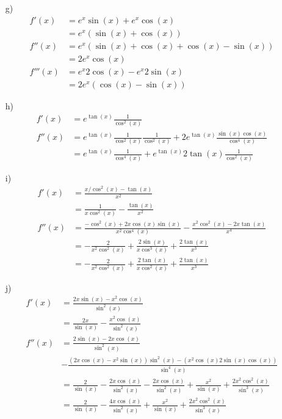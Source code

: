 {\begin{itemize}
\begin{align*}
f'''(x) &= 6 \cos^3(x) -6 \sin(x) 2 \cos(x)\sin(x)-9 \sin^2(x)\cos(x) \\
        &= 6 \cos^3(x) -21 \sin^2(x) \cos(x)             
\end{align*}
\item[g)]
\begin{align*}
f'(x) &= e^x \sin(x) + e^x \cos(x) \\
      &= e^x (\sin(x)+\cos(x)) \\
f''(x) &= e^x ( \sin(x) +\cos(x) +\cos(x) -\sin(x)) \\
       &= 2 e^x \cos(x) \\
f'''(x) &= e^x 2 \cos(x) - e^x 2 \sin(x) \\
        &= 2 e^x (\cos(x)-\sin(x))             
\end{align*}
\item[h)]
\begin{align*}
f'(x) &=   e^{\tan(x)} \frac{1}{\cos^2(x)}\\
f''(x) &=    e^{\tan(x)} \frac{1}{\cos^2(x)} \frac{1}{\cos^2(x)} + 2 e^{\tan(x)}  \frac{\sin(x) \cos(x)}{\cos^4(x)} \\
       &= e^{\tan(x)} \frac{1}{\cos^4(x)} + e^{\tan(x)} 2 \tan(x)  \frac{1}{\cos^2(x)}
\end{align*}
\item[i)]
\begin{align*}
f'(x) &= \frac{x/\cos^2(x) -\tan(x) }{x^2} \\
      &= \frac{1}{x \cos^2(x)} -\frac{\tan(x)}{x^2} \\
f''(x) &= \frac{-\cos^2(x)+2x\cos(x)\sin(x)}{x^2\cos^4(x)}- \frac{x^2\cos^2(x)-2x\tan(x)}{x^4} \\
       &= - \frac{2}{x^2 \cos^2(x)} +\frac{2 \sin(x)}{x \cos^3(x)} + \frac{2 \tan(x)}{x^3} \\
       &=   - \frac{2}{x^2 \cos^2(x)} +\frac{2 \tan(x)}{x \cos^2(x)} + \frac{2 \tan(x)}{x^3}    
\end{align*}
\item[j)]
\begin{align*}
f'(x) &=   \frac{2x \sin(x)-x^2\cos(x)}{\sin^2(x)}\\
      &= \frac{2x}{\sin(x)} - \frac{x^2 \cos(x)}{\sin^2(x)} \\
f''(x) &= \frac{2\sin(x)-2x\cos(x)}{\sin^2(x)} \\
&- \frac{(2x\cos(x)-x^2\sin(x))\sin^2(x)-(x^2 \cos(x)2\sin(x)\cos(x))}{\sin^4(x)}\\
       &= \frac{2}{\sin(x)} - \frac{2x\cos(x)}{\sin^2(x)} - \frac{2x\cos(x)}{\sin^2(x)}  + \frac{x^2}{\sin(x)} + \frac{2x^2\cos^2(x)}{\sin^3(x)} \\
       &=  \frac{2}{\sin(x)} - \frac{4x\cos(x)}{\sin^2(x)}+ \frac{x^2}{\sin(x)} + \frac{2x^2\cos^2(x)}{\sin^3(x)}
\end{align*}
\end{itemize}



}

